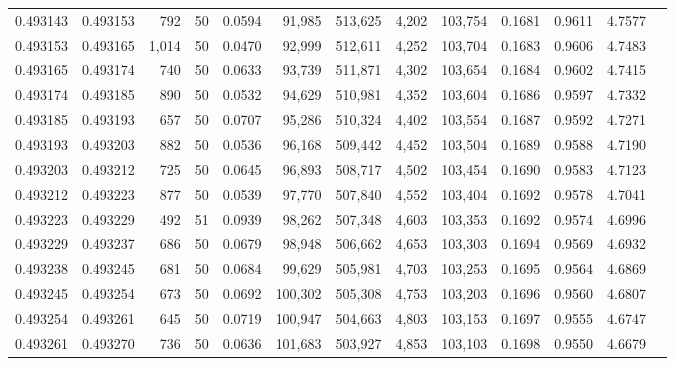 \begin{tabular}{rrrrrrrrrrrrr}
0.493143 & 0.493153 &   792 &  50 &                                     0.0594 &  91,985 & 513,625 &   4,202 & 103,754 & 0.1681 & 0.9611 & 4.7577 \\
0.493153 & 0.493165 & 1,014 &  50 &                                     0.0470 &  92,999 & 512,611 &   4,252 & 103,704 & 0.1683 & 0.9606 & 4.7483 \\
0.493165 & 0.493174 &   740 &  50 &                                     0.0633 &  93,739 & 511,871 &   4,302 & 103,654 & 0.1684 & 0.9602 & 4.7415 \\
0.493174 & 0.493185 &   890 &  50 &                                     0.0532 &  94,629 & 510,981 &   4,352 & 103,604 & 0.1686 & 0.9597 & 4.7332 \\
0.493185 & 0.493193 &   657 &  50 &                                     0.0707 &  95,286 & 510,324 &   4,402 & 103,554 & 0.1687 & 0.9592 & 4.7271 \\
0.493193 & 0.493203 &   882 &  50 &                                     0.0536 &  96,168 & 509,442 &   4,452 & 103,504 & 0.1689 & 0.9588 & 4.7190 \\
0.493203 & 0.493212 &   725 &  50 &                                     0.0645 &  96,893 & 508,717 &   4,502 & 103,454 & 0.1690 & 0.9583 & 4.7123 \\
0.493212 & 0.493223 &   877 &  50 &                                     0.0539 &  97,770 & 507,840 &   4,552 & 103,404 & 0.1692 & 0.9578 & 4.7041 \\
0.493223 & 0.493229 &   492 &  51 &                                     0.0939 &  98,262 & 507,348 &   4,603 & 103,353 & 0.1692 & 0.9574 & 4.6996 \\
0.493229 & 0.493237 &   686 &  50 &                                     0.0679 &  98,948 & 506,662 &   4,653 & 103,303 & 0.1694 & 0.9569 & 4.6932 \\
0.493238 & 0.493245 &   681 &  50 &                                     0.0684 &  99,629 & 505,981 &   4,703 & 103,253 & 0.1695 & 0.9564 & 4.6869 \\
0.493245 & 0.493254 &   673 &  50 &                                     0.0692 & 100,302 & 505,308 &   4,753 & 103,203 & 0.1696 & 0.9560 & 4.6807 \\
0.493254 & 0.493261 &   645 &  50 &                                     0.0719 & 100,947 & 504,663 &   4,803 & 103,153 & 0.1697 & 0.9555 & 4.6747 \\
0.493261 & 0.493270 &   736 &  50 &                                     0.0636 & 101,683 & 503,927 &   4,853 & 103,103 & 0.1698 & 0.9550 & 4.6679 \\

\end{tabular}
